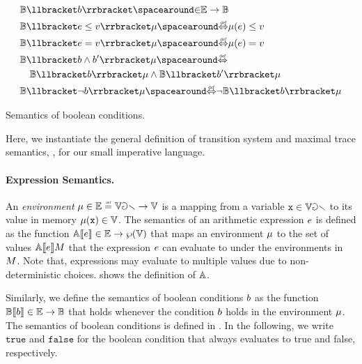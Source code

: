 \begin{marginfigure}
  \begin{align*}
    &\bexpsemantics \IN \env \to \B \\
    &\bexpsemanticsnoparam \semanticsof{\defaexp \le \defvalue} \defenv \DefifF \defenv(\defaexp) \le \defvalue \\
    &\bexpsemanticsnoparam \semanticsof{\defaexp = \defvalue} \defenv \DefifF \defenv(\defaexp) = \defvalue \\
    &\bexpsemanticsnoparam \semanticsof{\defbexp \land \defbexp'} \defenv \DefifF \\
      & \quad\bexpsemanticsnoparam \semanticsof{\defbexp}\defenv \land \bexpsemanticsnoparam \semanticsof{\defbexp'}\defenv \\
    &\bexpsemanticsnoparam \semanticsof{\lnot \defbexp} \defenv \DefifF \neg \bexpsemanticsnoparam \semanticsof{\defbexp}\defenv
  \end{align*}
\caption{Semantics of boolean conditions.}
\end{marginfigure}



Here, we instantiate the general definition of transition system and maximal trace semantics, \cf{} , for our small imperative language.

\paragraph{Expression Semantics.}


An \emph{environment} $\defenv\in\env\defeq\variables \to \values$ is a mapping from a variable $\textup{\texttt{x}}\in\mathbb{Var}$ to its value in memory $\mu(\textup{\texttt{x}})\in\mathbb{V}$.
The semantics of an arithmetic expression $e$ is defined as the function $\mathbb{A}\llbracket e \rrbracket\in\mathbb{E}\to\wp(\mathbb{V})$ that maps an environment $\mu$ to the set of values $\mathbb{A}\llbracket e \rrbracket M$ that the expression $e$ can evaluate to under the environments in $M$. Note that, expressions may evaluate to multiple values due to non-deterministic choices.
 shows the definition of $\mathbb{A}$.

Similarly, we define the semantics of boolean conditions $b$ as the function $\mathbb{B}\llbracket b \rrbracket\in\mathbb{E}\to\mathbb{B}$ that holds whenever the condition $b$ holds in the environment $\mu$. The semantics of boolean conditions is defined in . In the following, we write $\texttt{true}$ and $\texttt{false}$ for the boolean condition that always evaluates to true and false, respectively.







